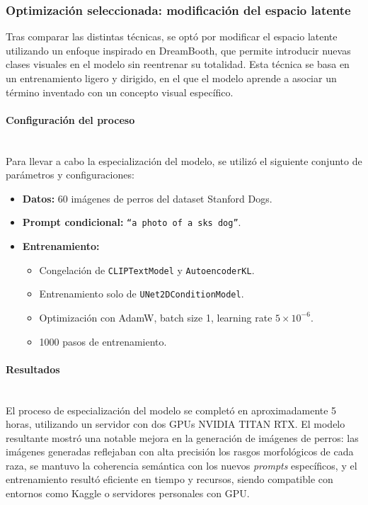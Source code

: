 \subsubsection{Optimización seleccionada: modificación del espacio latente}
Tras comparar las distintas técnicas, se optó por modificar el espacio latente utilizando un enfoque inspirado en DreamBooth, que permite introducir nuevas clases visuales en el modelo sin reentrenar su totalidad. Esta técnica se basa en un entrenamiento ligero y dirigido, en el que el modelo aprende a asociar un término inventado con un concepto visual específico.

\paragraph{\textbf{Configuración del proceso}} \mbox{}\\[0.5em]
Para llevar a cabo la especialización del modelo, se utilizó el siguiente conjunto de parámetros y configuraciones:
\begin{itemize}
\item \textbf{Datos:} 60 imágenes de perros del dataset Stanford Dogs.
\item \textbf{Prompt condicional:} \texttt{``a photo of a sks dog''}.
\item \textbf{Entrenamiento:}
\begin{itemize}
\item Congelación de \texttt{CLIPTextModel} y \texttt{AutoencoderKL}.
\item Entrenamiento solo de \texttt{UNet2DConditionModel}.
\item Optimización con AdamW, batch size 1, learning rate $5\times10^{-6}$.
\item 1000 pasos de entrenamiento.
\end{itemize}
\end{itemize}

\paragraph{\textbf{Resultados}} \mbox{}\\[0.5em]
El proceso de especialización del modelo se completó en aproximadamente 5 horas, utilizando un servidor con dos GPUs NVIDIA TITAN RTX. El modelo resultante mostró una notable mejora en la generación de imágenes de perros: las imágenes generadas reflejaban con alta precisión los rasgos morfológicos de cada raza, se mantuvo la coherencia semántica con los nuevos \textit{prompts} específicos, y el entrenamiento resultó eficiente en tiempo y recursos, siendo compatible con entornos como Kaggle o servidores personales con GPU.

